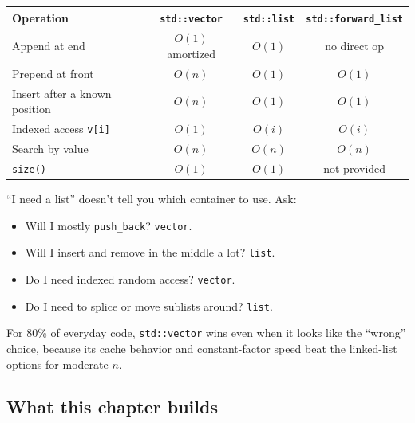 \documentclass[11pt]{article}
\begin{document}
\begin{center}
\footnotesize
\renewcommand{\arraystretch}{1.3}
\begin{tabular}{@{}lccc@{}}
\hline
\textbf{Operation}            & \texttt{std::vector} & \texttt{std::list} & \texttt{std::forward\_list} \\
\hline
Append at end                 & $O(1)$ amortized     & $O(1)$             & no direct op \\
Prepend at front              & $O(n)$               & $O(1)$             & $O(1)$ \\
Insert after a known position & $O(n)$               & $O(1)$             & $O(1)$ \\
Indexed access \texttt{v[i]}  & $O(1)$               & $O(i)$             & $O(i)$ \\
Search by value               & $O(n)$               & $O(n)$             & $O(n)$ \\
\texttt{size()}               & $O(1)$               & $O(1)$             & not provided \\
\hline
\end{tabular}
\end{center}

\begin{warnbox}
``I need a list'' doesn't tell you which container to use. Ask:
\begin{itemize}[leftmargin=*]
  \item Will I mostly \texttt{push\_back}? \texttt{vector}.
  \item Will I insert and remove in the middle a lot? \texttt{list}.
  \item Do I need indexed random access? \texttt{vector}.
  \item Do I need to splice or move sublists around? \texttt{list}.
\end{itemize}
For 80\% of everyday code, \texttt{std::vector} wins even when it
looks like the ``wrong'' choice, because its cache behavior and
constant-factor speed beat the linked-list options for moderate $n$.
\end{warnbox}

\subsection{What this chapter builds}
\end{document}
